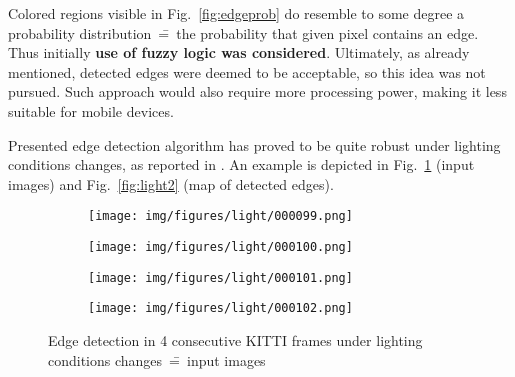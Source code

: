 Colored regions visible in Fig.~\ref{fig:edgeprob} do resemble to some degree a probability distribution~\==~the probability that given pixel contains an edge. Thus initially \textbf{use of fuzzy logic was considered}. Ultimately, as already mentioned, detected edges were deemed to be acceptable, so this idea was not pursued. Such approach would also require more processing power, making it less suitable for mobile devices.



Presented edge detection algorithm has proved to be quite robust under lighting conditions changes, as reported in \cite{jose2015realtime}. An example is depicted in Fig.~\ref{fig:light} (input images) and Fig.~\ref{fig:light2} (map of detected edges).

\begin{figure}[hp]
	\centering
	\begin{subfigure}{1\textwidth}
		\centering
		\centering\texttt{[image: img/figures/light/000099.png]}
		\subcaption{\label{fig:light_a}}
	\end{subfigure}
	\begin{subfigure}{1\textwidth}
		\centering
		\centering\texttt{[image: img/figures/light/000100.png]}
		\subcaption{\label{fig:light_b}}
	\end{subfigure}
	\begin{subfigure}{1\textwidth}
		\centering
		\centering\texttt{[image: img/figures/light/000101.png]}
		\subcaption{\label{fig:light_c}}
	\end{subfigure}
	\begin{subfigure}{1\textwidth}
		\centering
		\centering\texttt{[image: img/figures/light/000102.png]}
		\subcaption{\label{fig:light_d}}
	\end{subfigure}
	\caption{\label{fig:light} Edge detection in 4 consecutive KITTI \cite{kitti} frames under lighting conditions changes~\==~input images}
\end{figure}
		
